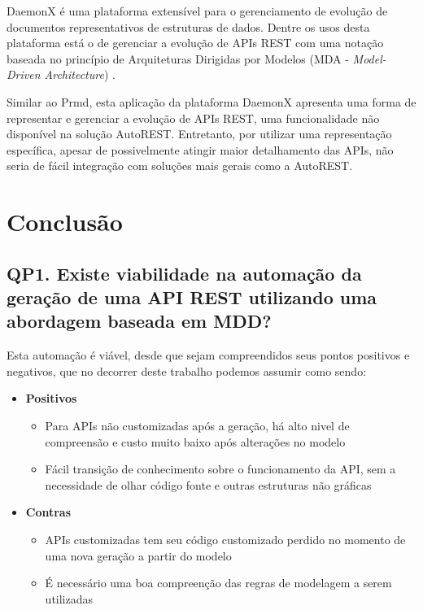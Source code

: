 DaemonX é uma plataforma extensível para o gerenciamento de evolução de documentos representativos de estruturas de dados. Dentre os usos desta plataforma está o de gerenciar a evolução de APIs REST com uma notação baseada no princípio de Arquiteturas Dirigidas por Modelos (MDA - \textit{Model-Driven Architecture}) \cite{POLAK:2015}.

Similar ao Prmd, esta aplicação da plataforma DaemonX apresenta uma forma de representar e gerenciar a evolução de APIs REST, uma funcionalidade não disponível na solução AutoREST. Entretanto, por utilizar uma representação específica, apesar de possivelmente atingir maior detalhamento das APIs, não seria de fácil integração com soluções mais gerais como a AutoREST.


\section{Conclusão}

\subsection{QP1. Existe viabilidade na automação da geração de uma API REST utilizando uma abordagem baseada em MDD?}

Esta automação é viável, desde que sejam compreendidos seus pontos positivos e negativos, que no decorrer deste trabalho podemos assumir como sendo:
\begin{itemize}
	\item \textbf{Positivos}
	\begin{itemize}
		\item Para APIs não customizadas após a geração, há alto nivel de compreensão e custo muito baixo após alterações no modelo
		\item Fácil transição de conhecimento sobre o funcionamento da API, sem a necessidade de olhar código fonte e outras estruturas não gráficas
	\end{itemize}
	\item \textbf{Contras}
	\begin{itemize}
		\item APIs customizadas tem seu código customizado perdido no momento de uma nova geração a partir do modelo
		\item É necessário uma boa compreenção das regras de modelagem a serem utilizadas
	\end{itemize}
\end{itemize}

